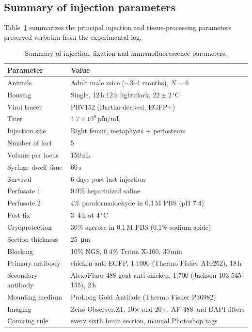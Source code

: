 \documentclass[11pt]{article}
\begin{document}
\subsection{Summary of injection parameters}
Table~\ref{tab:methods} summarizes the principal injection and tissue-processing parameters preserved verbatim from the experimental log.

\begin{table}[htbp]
\centering
\caption{Summary of injection, fixation and immunofluorescence parameters.}
\label{tab:methods}
\begin{tabular}{ll}
\toprule
Parameter & Value \\
\midrule
Animals & Adult male mice ($\sim$3--4 months), $N=6$ \\
Housing & Single, 12\,h:12\,h light:dark, $22\pm2$\,$^\circ$C \\
Viral tracer & PRV152 (Bartha-derived, EGFP+) \\
Titer & $4.7 \times 10^{9}$\,pfu/mL \\
Injection site & Right femur, metaphysis + periosteum \\
Number of loci & 5 \\
Volume per locus & 150\,nL \\
Syringe dwell time & 60\,s \\
Survival & 6 days post last injection \\
Perfusate 1 & 0.9\% heparinized saline \\
Perfusate 2 & 4\% paraformaldehyde in 0.1\,M PBS (pH 7.4) \\
Post-fix & 3--4\,h at 4\,$^\circ$C \\
Cryoprotection & 30\% sucrose in 0.1\,M PBS (0.1\% sodium azide) \\
Section thickness & \SI{25}{\micro\metre} \\
Blocking & 10\% NGS, 0.4\% Triton X-100, 30\,min \\
Primary antibody & chicken anti-EGFP, 1:1000 (Thermo Fisher A10262), 18\,h \\
Secondary antibody & AlexaFluor-488 goat anti-chicken, 1:700 (Jackson 103-545-155), 2\,h \\
Mounting medium & ProLong Gold Antifade (Thermo Fisher P36982) \\
Imaging & Zeiss Observer.Z1, 10$\times$ and 20$\times$, AF-488 and DAPI filters \\
Counting rule & every sixth brain section, manual Photoshop tags \\
\bottomrule
\end{tabular}
\end{table}
\end{document}
